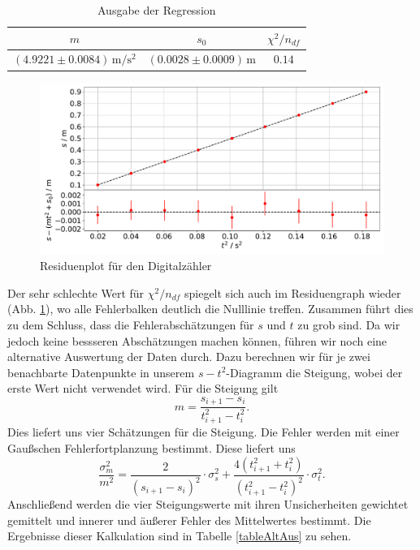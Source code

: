 \documentclass[a4paper, 12pt]{scrartcl}
\begin{document}
\begin{table}[h!]
\begin{center}
\begin{tabular}{c|c|c}
$m$ & $s_0$ & $\chi^2/n_{df}$ \\
\hline
$(4.9221 \pm 0.0084) \, \mathrm m / \mathrm s^2$ & $(0.0028 \pm 0.0009) \, \mathrm m$ & $0.14$
\end{tabular}
\caption{Ausgabe der Regression}
\label{tableReg1}
\end{center}
\end{table}

\begin{figure}[h!]
	\centering
	\includegraphics[width=\textwidth]{plots/regression_fF1.pdf}
	\caption{Residuenplot für den Digitalzähler}
	\label{ResDz}
\end{figure}

Der sehr schlechte Wert für $\chi^2/n_{df}$ spiegelt sich auch im Residuengraph wieder (Abb. \ref{ResDz}), wo alle Fehlerbalken deutlich die Nulllinie treffen. Zusammen führt dies zu dem Schluss, dass die Fehlerabschätzungen für $s$ und $t$ zu grob sind. Da wir jedoch keine bessseren Abschätzungen machen können, führen wir noch eine alternative Auswertung der Daten durch. Dazu berechnen wir für je zwei benachbarte Datenpunkte in unserem $s-t^2$-Diagramm die Steigung, wobei der erste Wert nicht verwendet wird. Für die Steigung gilt
$$m = \frac{s_{i+1}-s_i}{t_{i+1}^2-t_{i}^2}.$$
Dies liefert uns vier Schätzungen für die Steigung. Die Fehler werden mit einer Gaußschen Fehlerfortplanzung bestimmt. Diese liefert uns
$$\frac{\sigma_m^2}{m^2} = \frac{2}{(s_{i+1}-s_i)^2}\cdot\sigma_s^2 + \frac{4(t_{i+1}^2 + t_i^2)}{(t_{i+1}^2-t_i^2)^2}\cdot\sigma_t^2.$$
Anschließend werden die vier Steigungswerte mit ihren Unsicherheiten gewichtet gemittelt und innerer und äußerer Fehler des Mittelwertes bestimmt. Die Ergebnisse dieser Kalkulation sind in Tabelle \ref{tableAltAus} zu sehen. 
\end{document}
